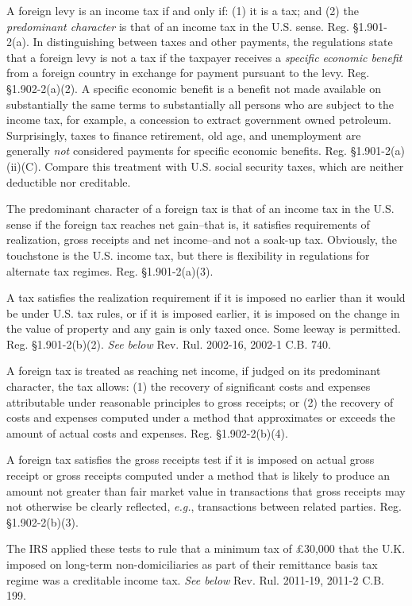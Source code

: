 A foreign levy is an income tax if and only if: (1) it is a tax; and (2) the \emph{predominant character} is that of an income tax in the U.S. sense. Reg. \S1.901-2(a).  In distinguishing between taxes and other payments, the regulations state that a foreign levy is not a tax if the taxpayer receives a \emph{specific economic benefit} from a foreign country in exchange for payment pursuant to the levy.  Reg. \S1.902-2(a)(2).  A specific economic benefit is a benefit not made available on substantially the same terms to substantially all persons who are subject to the income tax, for example, a concession to extract government owned petroleum.  Surprisingly, taxes to finance retirement, old age, and unemployment are generally \emph{not} considered payments for specific economic benefits. Reg. \S1.901-2(a)(ii)(C).  Compare this treatment with U.S. social security taxes, which are neither deductible nor creditable.

The predominant character of a foreign tax is that of an income tax in the U.S. sense if the foreign tax reaches net gain--that is, it satisfies requirements of realization, gross receipts and net income--and not a soak-up tax.  Obviously, the touchstone is the U.S. income tax, but there is flexibility in regulations for alternate tax regimes. Reg. \S1.901-2(a)(3).

A tax satisfies the realization requirement if it is imposed no earlier than it would be under U.S. tax rules, or if it is imposed earlier, it is imposed on the change in the value of property and any gain is only taxed once.  Some leeway is permitted. Reg. \S1.901-2(b)(2).  \emph{See below} Rev. Rul. 2002-16, 2002-1 C.B. 740.

A foreign tax is treated as reaching net income, if judged on its predominant character, the tax allows: (1) the recovery of significant costs and expenses attributable under reasonable principles to gross receipts; or (2) the recovery of costs and expenses computed under a method that approximates or exceeds the amount of actual costs and expenses.  Reg. \S1.902-2(b)(4).  

A foreign tax satisfies the gross receipts test if it is imposed on actual gross receipt or gross receipts computed under a method that is likely to produce an amount not greater than fair market value in transactions that gross receipts may not otherwise be clearly reflected, \emph{e.g.}, transactions between related parties.  Reg. \S1.902-2(b)(3).  

The IRS applied these tests to rule that a minimum tax of \pounds30,000 that the U.K. imposed on long-term non-domiciliaries as part of their remittance basis tax regime was a creditable income tax.  \emph{See below} Rev. Rul. 2011-19, 2011-2 C.B. 199.  

